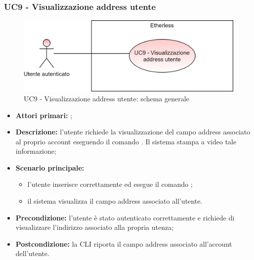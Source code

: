 \subsubsection{UC9 - Visualizzazione address utente}
\begin{figure}[h]
	\centering
	\includegraphics[scale=\ucs]{./res/img/UC9G.png}
	\caption {UC9 - Visualizzazione address utente: schema generale}
\end{figure}
\begin{itemize}
	\item \textbf{Attori primari:} \ua{};
	\item \textbf{Descrizione:} l’utente richiede la visualizzazione del campo address associato al proprio account eseguendo il comando \whoami{}. Il sistema stampa a video tale informazione; 
	\item \textbf{Scenario principale:} 
		\begin{itemize}
			\item l'utente inserisce correttamente ed esegue il comando \whoami{}; 
			\item il sistema visualizza il campo address associato all’utente.
		\end{itemize}
	\item \textbf{Precondizione:} l’utente è stato autenticato correttamente e richiede di visualizzare l’indirizzo associato alla propria utenza;
	\item \textbf{Postcondizione:} la CLI riporta il campo address associato all’account dell’utente.
\end{itemize}